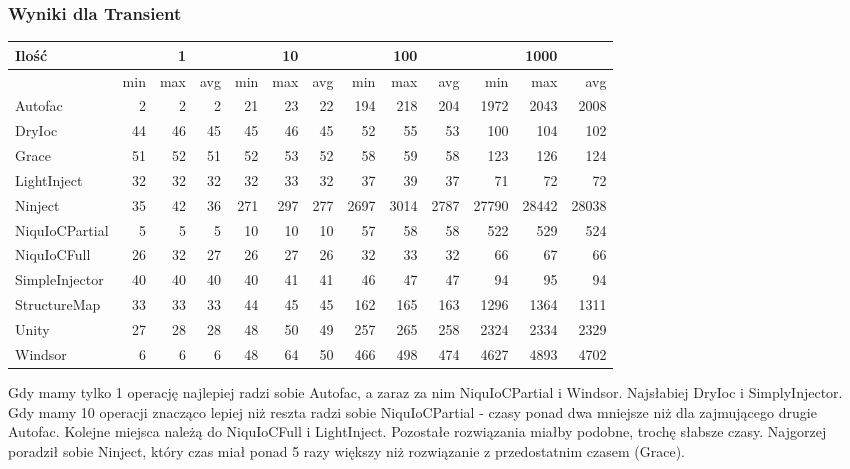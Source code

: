 \documentclass[12pt]{article}
\begin{document}
\subsubsection{Wyniki dla Transient}
\begin{center}
\begin{small}
	\begin{tabular}{ | l | r r r | r r r | r r r | r r r | }
    		\hline
     		Ilość & & 1 & & & 10 & & & 100 & & & 1000 & \\ \hline
     		 & min & max & avg & min & max & avg & min & max & avg & min & max & avg \\ \hline
    		Autofac & 2 & 2 & 2 & 21 & 23 & 22 & 194 & 218 & 204 & 1972 & 2043 & 2008 \\ \hline
		DryIoc & 44 & 46 & 45 & 45 & 46 & 45 & 52 & 55 & 53 & 100 & 104 & 102 \\ \hline
		Grace & 51 & 52 & 51 & 52 & 53 & 52 & 58 & 59 & 58 & 123 & 126 & 124 \\ \hline
		LightInject & 32 & 32 & 32 & 32 & 33 & 32 & 37 & 39 & 37 & 71 & 72 & 72 \\ \hline
		Ninject & 35 & 42 & 36 & 271 & 297 & 277 & 2697 & 3014 & 2787 & 27790 & 28442 & 28038 \\ \hline
		NiquIoCPartial & 5 & 5 & 5 & 10 & 10 & 10 & 57 & 58 & 58 & 522 & 529 & 524 \\ \hline
		NiquIoCFull & 26 & 32 & 27 & 26 & 27 & 26 & 32 & 33 & 32 & 66 & 67 & 66 \\ \hline
		SimpleInjector & 40 & 40 & 40 & 40 & 41 & 41 & 46 & 47 & 47 & 94 & 95 & 94 \\ \hline
		StructureMap & 33 & 33 & 33 & 44 & 45 & 45 & 162 & 165 & 163 & 1296 & 1364 & 1311 \\ \hline
		Unity & 27 & 28 & 28 & 48 & 50 & 49 & 257 & 265 & 258 & 2324 & 2334 & 2329 \\ \hline
		Windsor & 6 & 6 & 6 & 48 & 64 & 50 & 466 & 498 & 474 & 4627 & 4893 & 4702 \\
    		\hline
  	\end{tabular}
\end{small}
\end{center}
Gdy mamy tylko 1 operację najlepiej radzi sobie Autofac, a zaraz za nim NiquIoCPartial i Windsor. Najsłabiej DryIoc i SimplyInjector.\\
Gdy mamy 10 operacji znacząco lepiej niż reszta radzi sobie NiquIoCPartial - czasy ponad dwa mniejsze niż dla zajmującego drugie Autofac. Kolejne miejsca należą do NiquIoCFull i LightInject. Pozostałe rozwiązania miałby podobne, trochę słabsze czasy. Najgorzej poradził sobie Ninject, który czas miał ponad 5 razy większy niż rozwiązanie z przedostatnim czasem (Grace).\\
\end{document}
